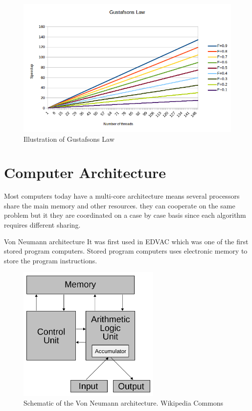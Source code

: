 \documentclass[10pt,a4paper]{report}
\begin{document}
\begin{figure}[h]
    \centering
    \includegraphics[width=13cm]{GustafsonsLaw.png}
    \caption{Illustration of Gustafsons Law}
    \label{fig:GustafsonsLaw}
\end{figure}

\clearpage
\section{Computer Architecture}
Most computers today have a multi-core architecture
means several processors share the main memory and other resources. they can cooperate on the same problem but it they are coordinated on a case by case basis since each algorithm requires different sharing.

Von Neumann architecture
It was first used in EDVAC which was one of the first stored program computers\cite{von1993first}. Stored program computers uses electronic memory to store the program instructions\cite{computer_arch_2003}.

\begin{figure}[h]
    \centering
    \includegraphics[width=7cm]{Von_Neumann_architecture.png}
    \caption{Schematic of the Von Neumann architecture. Wikipedia Commons}
    \label{fig:VonNeumann}
\end{figure}
\end{document}
